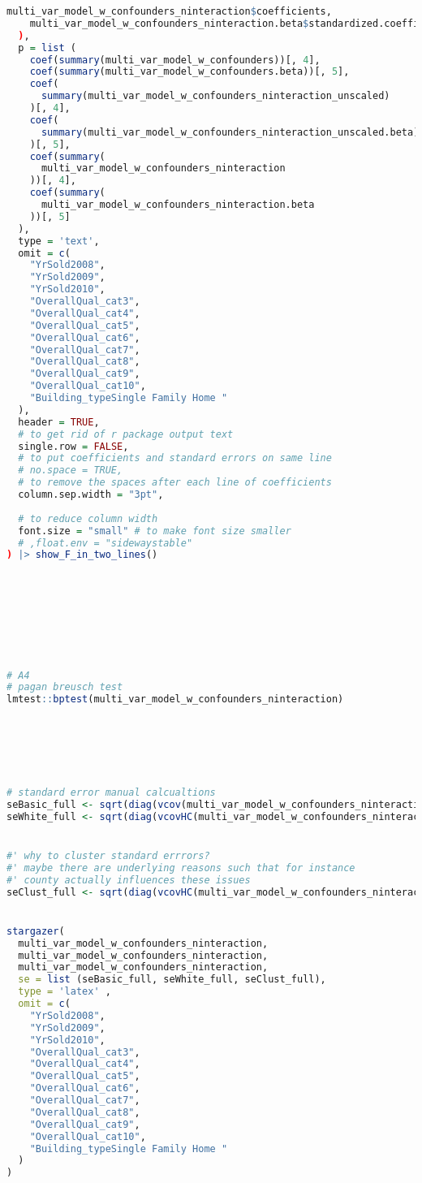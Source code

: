 \documentclass[a4paper]{article}
\begin{document}
\begin{lstlisting}[language=R]
    multi_var_model_w_confounders_ninteraction$coefficients,
    multi_var_model_w_confounders_ninteraction.beta$standardized.coefficients
  ),
  p = list (
    coef(summary(multi_var_model_w_confounders))[, 4],
    coef(summary(multi_var_model_w_confounders.beta))[, 5],
    coef(
      summary(multi_var_model_w_confounders_ninteraction_unscaled)
    )[, 4],
    coef(
      summary(multi_var_model_w_confounders_ninteraction_unscaled.beta)
    )[, 5],
    coef(summary(
      multi_var_model_w_confounders_ninteraction
    ))[, 4],
    coef(summary(
      multi_var_model_w_confounders_ninteraction.beta
    ))[, 5]
  ),
  type = 'text',
  omit = c(
    "YrSold2008",
    "YrSold2009",
    "YrSold2010",
    "OverallQual_cat3",
    "OverallQual_cat4",
    "OverallQual_cat5",
    "OverallQual_cat6",
    "OverallQual_cat7",
    "OverallQual_cat8",
    "OverallQual_cat9",
    "OverallQual_cat10",
    "Building_typeSingle Family Home "
  ),
  header = TRUE,
  # to get rid of r package output text
  single.row = FALSE,
  # to put coefficients and standard errors on same line
  # no.space = TRUE,
  # to remove the spaces after each line of coefficients
  column.sep.width = "3pt",
  
  # to reduce column width
  font.size = "small" # to make font size smaller
  # ,float.env = "sidewaystable"
) |> show_F_in_two_lines()








# A4
# pagan breusch test
lmtest::bptest(multi_var_model_w_confounders_ninteraction)






# standard error manual calcualtions
seBasic_full <- sqrt(diag(vcov(multi_var_model_w_confounders_ninteraction)))
seWhite_full <- sqrt(diag(vcovHC(multi_var_model_w_confounders_ninteraction, type = 'HC0')))


#' why to cluster standard errrors? 
#' maybe there are underlying reasons such that for instance
#' county actually influences these issues 
seClust_full <- sqrt(diag(vcovHC(multi_var_model_w_confounders_ninteraction, cluster = 'Neighborhood')))


stargazer(
  multi_var_model_w_confounders_ninteraction,
  multi_var_model_w_confounders_ninteraction,
  multi_var_model_w_confounders_ninteraction,
  se = list (seBasic_full, seWhite_full, seClust_full),
  type = 'latex' ,
  omit = c(
    "YrSold2008",
    "YrSold2009",
    "YrSold2010",
    "OverallQual_cat3",
    "OverallQual_cat4",
    "OverallQual_cat5",
    "OverallQual_cat6",
    "OverallQual_cat7",
    "OverallQual_cat8",
    "OverallQual_cat9",
    "OverallQual_cat10",
    "Building_typeSingle Family Home "
  )
)










\end{lstlisting}
\end{document}
